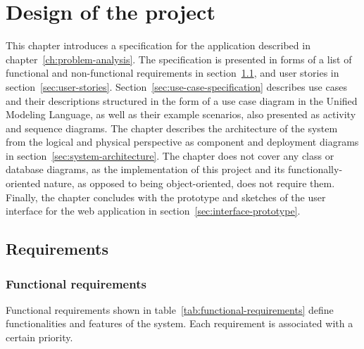 \documentclass[english,engineering]{wizthesis}
\begin{document}
\chapter{Design of the project}

This chapter introduces a specification for the application described in
chapter~\ref{ch:problem-analysis}. The specification is presented in forms of a
list of functional and non-functional requirements in
section~\ref{sec:requirements}, and user stories in
section~\ref{sec:user-stories}. Section~\ref{sec:use-case-specification}
describes use cases and their descriptions structured in the form of a use case
diagram in the Unified Modeling Language, as well as their example scenarios,
also presented as activity and sequence diagrams. The chapter describes the
architecture of the system from the logical and physical perspective as
component and deployment diagrams in section~\ref{sec:system-architecture}. The
chapter does not cover any class or database diagrams, as the implementation of
this project and its functionally-oriented nature, as opposed to being
object-oriented, does not require them. Finally, the chapter concludes with the
prototype and sketches of the user interface for the web application in
section~\ref{sec:interface-prototype}.

\section{Requirements} \label{sec:requirements}

\subsection{Functional requirements}

Functional requirements shown in table~\ref{tab:functional-requirements} define
functionalities and features of the system. Each requirement is associated with
a certain priority.
\end{document}
